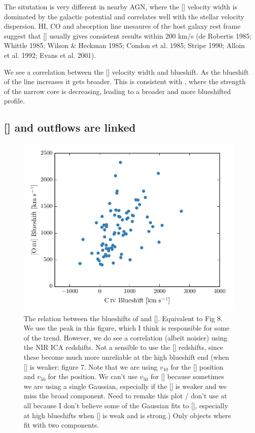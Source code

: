 The situtation is very different in nearby AGN, where the [] velocity width is dominated by the galactic potential and correlates well with the stellar velocity dispersion.
HI, CO and absorption line mesaures of the host galaxy rest frame suggest that [] usually gives consistent results within 200 km/s (de Robertis 1985; Whittle 1985; Wilson \& Heckman 1985; Condon et al. 1985; Stripe 1990; Alloin et al. 1992; Evans et al. 2001).  

We see a correlation between the [] velocity width and blueshift. 
As the blueshift of the line increases it gets broader. 
This is consistent with \citet{shen14}, where the strength of the narrow core is decreasing, leading to a broader and more blueshifted profile. 


\subsection{[] and  outflows are linked}

\begin{figure}
    \includegraphics[width=\columnwidth]{figures/chapter04/oiii_civ_blueshifts.pdf} 
    \caption{The relation between the blueshifts of  and []. Equivalent to Fig 8. We use the \hb peak in this figure, which I think is responsible for some of the trend. However, we do see a correlation (albeit noisier) using the NIR ICA redshifts. Not a sensible to use the [] redshifts, since these become much more unreliable at the high  blueshift end (when [] is weaker: figure 7. Note that we are using $v_{10}$ for the [] position and $v_{50}$ for the  position. We can't use $v_{50}$ for [] because sometimes we are using a single Gaussian, especially if the [] is weaker and we miss the broad component. Need to remake this plot / don't use at all because I don't believe some of the Gaussian fits to [], especially at high  blueshifts when [] is weak and  is strong.) Only objects where fit with two components.}     
    \label{fig:oiii_civ_blueshifts}
\end{figure}

